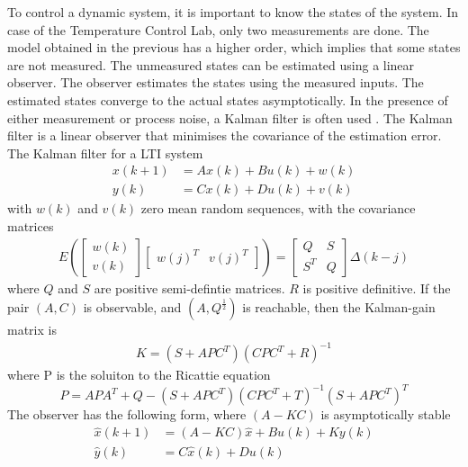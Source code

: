 \label{sec:kalmanFilter}
To control a dynamic system, it is important to know the states of the system. In case of the Temperature Control Lab, only two measurements are done. The model obtained in the previous has a higher order, which implies that some states are not measured. The unmeasured states can be estimated using a linear observer. The observer estimates the states using the measured inputs. The estimated states converge to the actual states asymptotically.
In the presence of either measurement or process noise, a Kalman filter is often used \cite{kalmanFilter}. The Kalman filter is a linear observer that minimises the covariance of the estimation error. The Kalman filter for a LTI system \cite[p.~162]{FilteringIdentification}
\begin{align*}
    x(k+1) &= Ax(k) +Bu(k) + w(k)\\
    y(k) &= Cx(k) + Du(k) + v(k)
\end{align*}
with $w(k)$ and $v(k)$ zero mean random sequences, with the covariance matrices
\begin{align*}
    E(\begin{bmatrix} w(k) \\ v(k) \end{bmatrix} \begin{bmatrix} w(j)^T & v(j)^T \end{bmatrix}) = \begin{bmatrix} Q & S \\ S^T & Q \end{bmatrix} \Delta(k-j)
\end{align*}
where $Q$ and $S$ are positive semi-defintie matrices. $R$ is positive definitive. If the pair $(A,C)$ is observable, and $(A,Q^{\frac{1}{2}})$ is reachable, then the Kalman-gain matrix is 
\begin{align*}
    K = (S+APC^T)(CPC^T+R)^{-1}
\end{align*}
where P is the soluiton to the Ricattie equation
$$
    P = APA^T + Q - (S+APC^T)(CPC^T+T)^{-1}(S+APC^T)^T
$$
The observer has the following form, where $(A-KC)$ is asymptotically stable
\begin{align}
    \hat{x}(k+1) &= (A-KC)\hat{x} + Bu(k) + Ky(k) \label{eq:kalmanSU1}\\
    \hat{y}(k) &= C\hat{x}(k) + Du(k) \label{eq:kalmanSU2}
\end{align}
